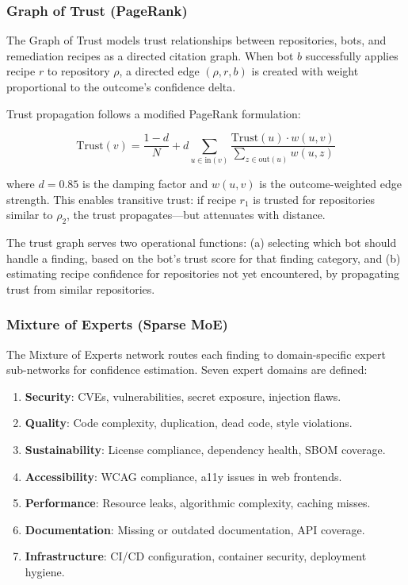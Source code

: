 \documentclass[11pt,a4paper]{article}
\begin{document}
\subsubsection{Graph of Trust (PageRank)}
\label{subsubsec:got}

The Graph of Trust models trust relationships between repositories, bots, and remediation recipes as a directed citation graph. When bot $b$ successfully applies recipe $r$ to repository $\rho$, a directed edge $(\rho, r, b)$ is created with weight proportional to the outcome's confidence delta.

Trust propagation follows a modified PageRank formulation:

\begin{equation}
\text{Trust}(v) = \frac{1 - d}{N} + d \sum_{u \in \text{in}(v)} \frac{\text{Trust}(u) \cdot w(u, v)}{\sum_{z \in \text{out}(u)} w(u, z)}
\label{eq:trust}
\end{equation}

\noindent where $d = 0.85$ is the damping factor and $w(u, v)$ is the outcome-weighted edge strength. This enables transitive trust: if recipe $r_1$ is trusted for repositories similar to $\rho_2$, the trust propagates---but attenuates with distance.

The trust graph serves two operational functions: (a) selecting which bot should handle a finding, based on the bot's trust score for that finding category, and (b) estimating recipe confidence for repositories not yet encountered, by propagating trust from similar repositories.

\subsubsection{Mixture of Experts (Sparse MoE)}
\label{subsubsec:moe}

The Mixture of Experts network routes each finding to domain-specific expert sub-networks for confidence estimation. Seven expert domains are defined:

\begin{enumerate}[nosep]
  \item \textbf{Security}: CVEs, vulnerabilities, secret exposure, injection flaws.
  \item \textbf{Quality}: Code complexity, duplication, dead code, style violations.
  \item \textbf{Sustainability}: License compliance, dependency health, SBOM coverage.
  \item \textbf{Accessibility}: WCAG compliance, a11y issues in web frontends.
  \item \textbf{Performance}: Resource leaks, algorithmic complexity, caching misses.
  \item \textbf{Documentation}: Missing or outdated documentation, API coverage.
  \item \textbf{Infrastructure}: CI/CD configuration, container security, deployment hygiene.
\end{enumerate}
\end{document}
